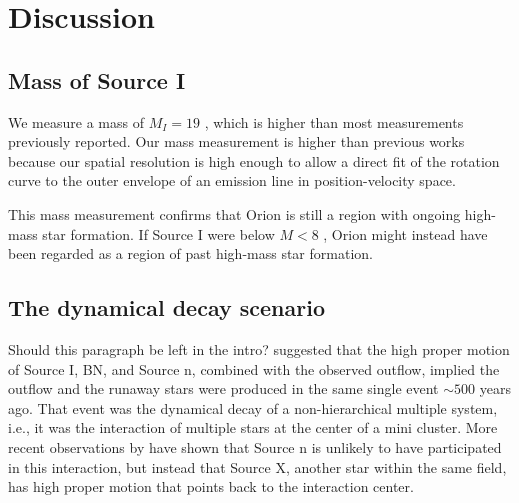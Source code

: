 \documentclass[twocolumn]{aastex61}
\begin{document}
% 


\section{Discussion}
\subsection{Mass of Source I}
We measure a mass of $M_I=19$ \msun, which is higher than most measurements
previously reported.  Our mass measurement is higher than previous works
because our spatial resolution is high enough to allow a direct fit of the
rotation curve to the outer envelope of an emission line in position-velocity
space.

This mass measurement confirms that Orion is still a region with ongoing
high-mass star formation.  If Source I were below $M<8$ \msun, Orion might
instead have been regarded as a region of past high-mass star formation.

\subsection{The dynamical decay scenario}
{\color{red} Should this paragraph be left in the intro?}
\citet[][and earlier authors?]{Bally2011a} suggested that the high proper
motion of Source I, BN, and Source n, combined with the observed \hh outflow,
implied the outflow and the runaway stars were produced in the same single
event $\sim500$ years ago.  That event was the dynamical decay of a
non-hierarchical multiple system, i.e., it was the interaction of multiple
stars at the center of a mini cluster.  More recent observations by
\citet{Luhman2017a} have shown that Source n is unlikely to have participated
in this interaction, but instead that Source X, another star within the same
field, has high proper motion that points back to the interaction center.
\end{document}
